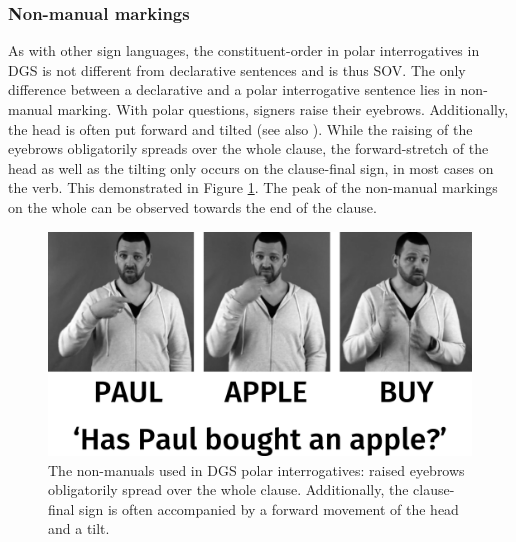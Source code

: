 \subsubsection{Non-manual markings}
As with other sign languages, the constituent-order in polar interrogatives in DGS is not different from declarative sentences and is thus SOV. The only difference between a declarative and a polar interrogative sentence lies in non-manual marking. With polar questions, signers raise their eyebrows. Additionally, the head is often put forward and tilted (see also \citealt[171--172]{papaspyrou2008grammatik}). While the raising of the eyebrows obligatorily spreads over the whole clause, the forward-stretch of the head as well as the tilting only occurs on the clause-final sign, in most cases on the verb. This demonstrated in Figure \ref{fig:polarint}. The peak of the non-manual markings on the whole can be observed towards the end of the clause.

\begin{figure}[bt]
\centering
	\includegraphics[width=1.0\textwidth]{yesnoquestionsw.jpg}
	\caption{The non-manuals used in DGS polar interrogatives: raised eyebrows obligatorily spread over the whole clause. Additionally, the clause-final sign is often accompanied by a forward movement of the head and a tilt.}
	\label{fig:polarint}
\end{figure}

